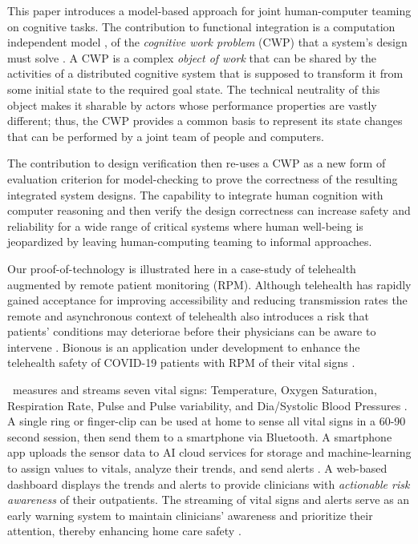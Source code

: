  This paper introduces a model-based approach for joint human-computer teaming on cognitive tasks. The contribution to functional integration is a computation independent model \cite{Garrido}, of the \emph{cognitive work problem} (CWP) that a system's design must solve \cite{workflowmodel,workcentered,BERRY201615,chi2010}.
A CWP is a complex \emph{object of work} that can be shared by the activities of a distributed cognitive system that is supposed to transform it from some initial state to the required goal state.
The technical neutrality of this object makes it sharable by actors whose performance properties are vastly different; thus, the CWP provides a common basis to represent its state changes that can be performed by a joint team of people and computers. 

The contribution to design verification then re-uses a CWP as a new form of evaluation criterion for model-checking to prove the correctness of the resulting integrated system designs.
The capability to integrate human cognition with computer reasoning and then verify the design correctness can increase safety and reliability for a wide range of critical systems where human well-being is jeopardized by leaving human-computing teaming to informal approaches.

Our proof-of-technology is illustrated here in a case-study of telehealth augmented by remote patient monitoring (RPM). 
Although telehealth has rapidly gained acceptance for improving accessibility \cite{Medicare,Mayo,Aalam229} and reducing transmission rates \cite{10.1093/jamia/ocaa048,10.1093/jamia/ocaa067} the remote and asynchronous context of telehealth also introduces a risk that patients' conditions may deteriorae before their physicians can be aware to intervene \cite{10.1097/ALN.0000000000003578}.
Bionous \phware is an application under development to enhance the telehealth safety of COVID-19 patients with RPM of their vital signs \cite{Phware}.

\phware\ measures and streams seven vital signs: Temperature, Oxygen Saturation, Respiration Rate, Pulse and Pulse variability, and Dia/Systolic Blood Pressures .
A single \phware ring or finger-clip can be used at home to sense all vital signs in a 60-90 second session, then send them to a smartphone via Bluetooth.
A smartphone app uploads the sensor data to AI cloud services for storage and machine-learning to assign values to vitals, analyze their trends, and send alerts \cite{Altschul2004PredictiveMI,10.2307/2984877,10.5555/1643031.1643047}.
A web-based dashboard displays the trends and alerts to provide clinicians with \emph{actionable risk awareness} of their outpatients.
The streaming of vital signs and alerts serve as an early warning system to maintain clinicians’ awareness and prioritize their attention, thereby enhancing home care safety .

